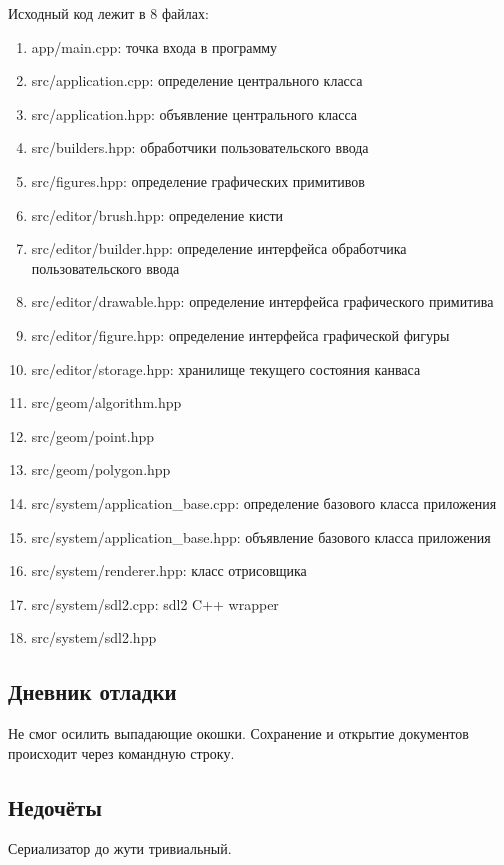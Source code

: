 \documentclass[12pt]{article}
\begin{document}
Исходный код лежит в 8 файлах:
\begin{enumerate}
\item app/main.cpp: точка входа в программу
\item src/application.cpp: определение центрального класса
\item src/application.hpp: объявление центрального класса
\item src/builders.hpp: обработчики пользовательского ввода
\item src/figures.hpp: определение графических примитивов
\item src/editor/brush.hpp: определение кисти
\item src/editor/builder.hpp: определение интерфейса обработчика пользовательского ввода
\item src/editor/drawable.hpp: определение интерфейса графического примитива
\item src/editor/figure.hpp: определение интерфейса графической фигуры
\item src/editor/storage.hpp: хранилище текущего состояния канваса 
\item src/geom/algorithm.hpp
\item src/geom/point.hpp
\item src/geom/polygon.hpp
\item src/system/application\_base.cpp: определение базового класса приложения
\item src/system/application\_base.hpp: объявление базового класса приложения
\item src/system/renderer.hpp: класс отрисовщика
\item src/system/sdl2.cpp: sdl2 C++ wrapper 
\item src/system/sdl2.hpp

\end{enumerate}

\subsection*{Дневник отладки}

Не смог осилить выпадающие окошки. Сохранение и открытие документов происходит через командную строку. 

\subsection*{Недочёты}

Сериализатор до жути тривиальный.
\end{document}
